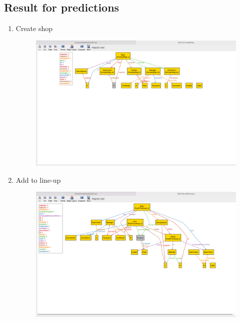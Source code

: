 \subsection{Result for predictions}
\begin{enumerate}
    \item Create shop \\
    \begin{figure}[H]
      \centering
      \includegraphics[width=0.9\textheight,keepaspectratio, angle=90]{images/alloy_createShop.png}
    \end{figure}
    \clearpage
    
    \item Add to line-up \\
    \begin{figure}[H]
      \centering
      \includegraphics[width=0.9\textheight,keepaspectratio, angle=90]{images/alloy_addToLineup.png}
    \end{figure}
    \clearpage
    

\end{enumerate}

